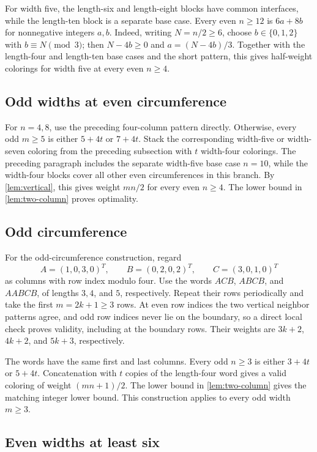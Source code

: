 \documentclass[11pt]{article}
\theoremstyle{definition}
\theoremstyle{remark}
\begin{document}
For width five, the length-six and length-eight blocks have common interfaces, while the length-ten block is a separate base case. Every even $n\geq 12$ is $6a+8b$ for nonnegative integers $a,b$. Indeed, writing $N=n/2\geq 6$, choose $b\in\{0,1,2\}$ with $b\equiv N\pmod 3$; then $N-4b\geq 0$ and $a=(N-4b)/3$. Together with the length-four and length-ten base cases and the short pattern, this gives half-weight colorings for width five at every even $n\geq 4$.

\subsection{Odd widths at even circumference}

For $n=4,8$, use the preceding four-column pattern directly. Otherwise, every odd $m\geq 5$ is either $5+4t$ or $7+4t$. Stack the corresponding width-five or width-seven coloring from the preceding subsection with $t$ width-four colorings. The preceding paragraph includes the separate width-five base case $n=10$, while the width-four blocks cover all other even circumferences in this branch. By \cref{lem:vertical}, this gives weight $mn/2$ for every even $n\geq 4$. The lower bound in \cref{lem:two-column} proves optimality.

\subsection{Odd circumference}

For the odd-circumference construction, regard
\[
 A=(1,0,3,0)^T,\qquad B=(0,2,0,2)^T,\qquad C=(3,0,1,0)^T
\]
as columns with row index modulo four. Use the words $ACB$, $ABCB$, and $AABCB$, of lengths $3,4$, and $5$, respectively. Repeat their rows periodically and take the first $m=2k+1\geq 3$ rows. At even row indices the two vertical neighbor patterns agree, and odd row indices never lie on the boundary, so a direct local check proves validity, including at the boundary rows. Their weights are $3k+2$, $4k+2$, and $5k+3$, respectively.

The words have the same first and last columns. Every odd $n\geq 3$ is either $3+4t$ or $5+4t$. Concatenation with $t$ copies of the length-four word gives a valid coloring of weight $(mn+1)/2$. The lower bound in \cref{lem:two-column} gives the matching integer lower bound. This construction applies to every odd width $m\geq 3$.

\subsection{Even widths at least six}
\end{document}
